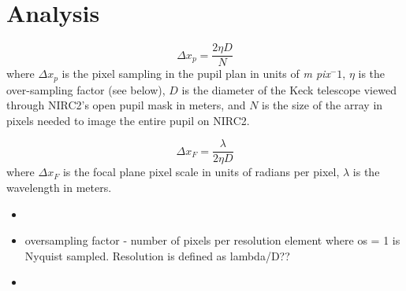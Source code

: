 \section{Analysis}

\begin{equation}
\Delta x_p = \frac{2 \eta D}{N}
\end{equation}
where $\Delta x_p$ is the pixel sampling in the pupil plan in units of {\em m pix$^-1$}, $\eta$ is the over-sampling factor (see below), $D$ is the diameter of the Keck telescope viewed through NIRC2's open pupil mask in meters, and $N$ is the size of the array in pixels needed to image the entire pupil on NIRC2.

\begin{equation}
\Delta x_F = \frac{\lambda}{2 \eta D}
\end{equation}
where $\Delta x_F$ is the focal plane pixel scale in units of radians per pixel, $\lambda$ is the wavelength in meters.



\begin{itemize}
\item 
\item oversampling factor - number of pixels per resolution element where os = 1 is Nyquist sampled. Resolution is defined as lambda/D??
\item 
\end{itemize}